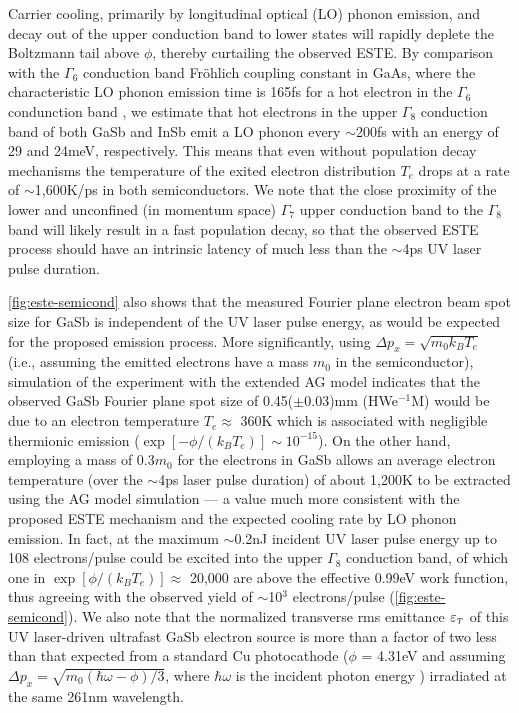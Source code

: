 Carrier cooling, primarily by longitudinal optical (LO) phonon emission, and decay out of the upper conduction band to lower states will rapidly deplete the Boltzmann tail above $\phi$, thereby curtailing the observed ESTE.
By comparison with the $\Gamma_6$ conduction band Fr\"ohlich coupling constant in GaAs, where the characteristic LO phonon emission time is 165fs for a hot electron in the $\Gamma_6$ condunction band \cite{kash_subpicosecond_1985}, we estimate that hot electrons in the upper $\Gamma_8$ conduction band of both GaSb and InSb emit a LO phonon every $\sim$200fs with an energy of 29 and 24meV, respectively.
This means that even without population decay mechanisms the temperature of the exited electron distribution $T_e$ drops at a rate of $\sim$1,600K/ps in both semiconductors.
We note that the close proximity of the lower and unconfined (in momentum space) $\Gamma_7$ upper conduction band to the $\Gamma_8$ band will likely result in a fast population decay, so that the observed ESTE process should have an intrinsic latency of much less than the $\sim$4ps UV laser pulse duration.

\ref{fig:este-semicond} also shows that the measured Fourier plane electron beam spot size for GaSb is independent of the UV laser pulse energy, as would be expected for the proposed emission process.
More significantly, using $\Delta p_x = \sqrt{m_0 k_B T_e}$ (i.e., assuming the emitted electrons have a mass $m_0$ in the semiconductor), simulation of the experiment with the extended AG model \cite{berger_semi-analytic_2010} indicates that the observed GaSb Fourier plane spot size of 0.45($\pm$0.03)mm (HWe$^{-1}$M) would be due to an electron temperature $T_e \approx$ 360K which is associated with negligible thermionic emission ($\exp[-\phi/(k_B T_e)] \sim 10^{-15}$).
On the other hand, employing a mass of 0.3$m_0$ for the electrons in GaSb allows an average electron temperature (over the $\sim$4ps laser pulse duration) of about 1,200K to be extracted using the AG model simulation --- a value much more consistent with the proposed ESTE mechanism and the expected cooling rate by LO phonon emission.
In fact, at the maximum $\sim$0.2nJ incident UV laser pulse energy up to 108 electrons/pulse could be excited into the upper $\Gamma_8$ conduction band, of which one in $\exp[\phi/(k_B T_e)] \approx$ 20,000 are above the effective 0.99eV work function, thus agreeing with the observed yield of $\sim$10$^3$ electrons/pulse (\ref{fig:este-semicond}).
We also note that the normalized transverse rms emittance $\varepsilon_{{\scriptscriptstyle T}}$ of this UV laser-driven ultrafast GaSb electron source is more than a factor of two less than that expected from a standard Cu photocathode ($\phi$ = 4.31eV and assuming $\Delta p_x = \sqrt{m_0 ( \hbar \omega - \phi ) / 3 }$, where $\hbar \omega$ is the incident photon energy \cite{dowell_quantum_2009,jensen_emittance_2010}) irradiated at the same 261nm wavelength.

